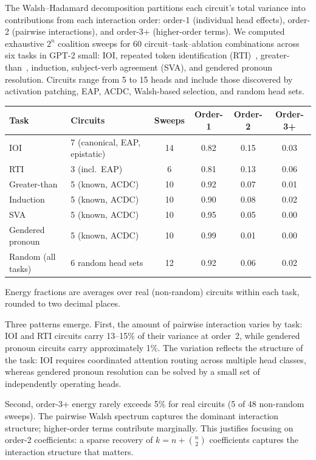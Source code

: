\documentclass{article}
\begin{document}
The Walsh--Hadamard decomposition partitions each circuit's total
variance into contributions from each interaction order: order-1
(individual head effects), order-2 (pairwise interactions), and
order-3+ (higher-order terms). We computed exhaustive $2^n$ coalition
sweeps for 60 circuit--task--ablation combinations across six tasks in
GPT-2 small: IOI, repeated token identification
(RTI)~\citep{tower2025rti}, greater-than~\citep{hanna2023greater},
induction, subject-verb agreement (SVA), and gendered pronoun
resolution. Circuits range from 5 to 15 heads and include those
discovered by activation patching, EAP, ACDC, Walsh-based selection,
and random head sets.

\medskip

{\small
\begin{tabular}{llcccc}
\toprule
Task & Circuits & Sweeps & Order-1 & Order-2 & Order-3+ \\
\midrule
IOI            & 7 (canonical, EAP, epistatic) & 14 & 0.82 & 0.15 & 0.03 \\
RTI            & 3 (incl.\ EAP)               &  6 & 0.81 & 0.13 & 0.06 \\
Greater-than   & 5 (known, ACDC)               & 10 & 0.92 & 0.07 & 0.01 \\
Induction      & 5 (known, ACDC)               & 10 & 0.90 & 0.08 & 0.02 \\
SVA            & 5 (known, ACDC)               & 10 & 0.95 & 0.05 & 0.00 \\
Gendered pronoun & 5 (known, ACDC)             & 10 & 0.99 & 0.01 & 0.00 \\
\midrule
Random (all tasks) & 6 random head sets        & 12 & 0.92 & 0.06 & 0.02 \\
\bottomrule
\end{tabular}
}

\medskip

\noindent Energy fractions are averages over real (non-random) circuits
within each task, rounded to two decimal places.

Three patterns emerge. First, the amount of pairwise interaction varies
by task: IOI and RTI circuits carry 13--15\% of their variance at
order~2, while gendered pronoun circuits carry approximately 1\%. The
variation reflects the structure of the task: IOI requires coordinated
attention routing across multiple head classes, whereas gendered pronoun
resolution can be solved by a small set of independently operating heads.

Second, order-3+ energy rarely exceeds 5\% for real circuits (5 of 48
non-random sweeps). The pairwise Walsh spectrum captures the dominant
interaction structure; higher-order terms contribute marginally. This
justifies focusing on order-2 coefficients: a sparse recovery of
$k = n + \binom{n}{2}$ coefficients captures the interaction structure
that matters.
\end{document}
